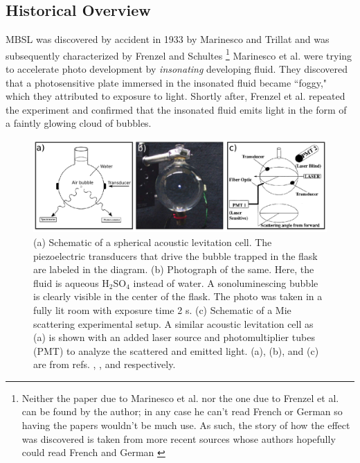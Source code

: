 \documentclass[rmp,aps,nofootinbib,superscriptaddress,floatfix]{revtex4-2}
\begin{document}
\subsection{Historical Overview}

MBSL was discovered by accident in 1933 by Marinesco and Trillat \cite{marinesco1933actions} and was subsequently characterized by Frenzel and Schultes \cite{frenzel1934luminescenz} \footnote{Neither the paper due to Marinesco et al. nor the one due to Frenzel et al. can be found by the author; in any case he can't read French or German so having the papers wouldn't be much use. As such, the story of how the effect was discovered is taken from more recent sources whose authors hopefully could read French and German \cite{brenner2002single,gaitan1990experimental,crum1994sonoluminescence}} Marinesco et al. were trying to accelerate photo development by \emph{insonating} developing fluid. They discovered that a photosensitive plate immersed in the insonated fluid became ``foggy," which they attributed to exposure to light. Shortly after, Frenzel et al. repeated the experiment and confirmed that the insonated fluid emits light in the form of a faintly glowing cloud of bubbles. 

\begin{figure}
\includegraphics[width=0.95\linewidth]{figs/flask.pdf}
    \caption{(a) Schematic of a spherical acoustic levitation cell. The piezoelectric transducers that drive the bubble trapped in the flask are labeled in the diagram. (b) Photograph of the same. Here, the fluid is aqueous H$_2$SO$_4$ instead of water. A sonoluminescing bubble is clearly visible in the center of the flask. The photo was taken in a fully lit room with exposure time 2 s. (c) Schematic of a Mie scattering experimental setup. A similar acoustic levitation cell as (a) is shown with an added laser source and photomultiplier tubes (PMT) to analyze the scattered and emitted light. (a), (b), and (c) are from refs. \cite{brenner2002single}, \cite{suslick2008inside}, and \cite{gompf2000mie} respectively.}
\label{fig:flask}
\end{figure}
\end{document}
